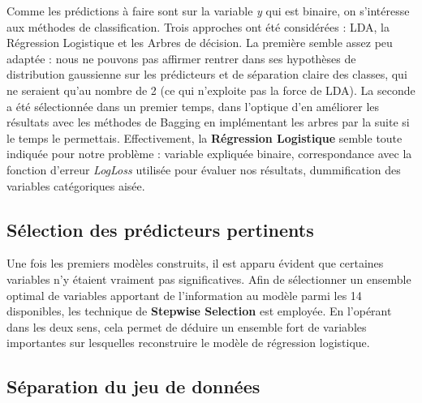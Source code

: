 \documentclass[]{article}
\begin{document}
Comme les prédictions à faire sont sur la variable \textit{y} qui est binaire, on s'intéresse aux méthodes de classification. Trois approches ont été considérées : LDA, la Régression Logistique et les Arbres de décision. La première semble assez peu adaptée : nous ne pouvons pas affirmer rentrer dans ses hypothèses de distribution gaussienne sur les prédicteurs et de séparation claire des classes, qui ne seraient qu'au nombre de 2 (ce qui n'exploite pas la force de LDA). La seconde a été sélectionnée dans un premier temps, dans l'optique d'en améliorer les résultats avec les méthodes de Bagging en implémentant les arbres par la suite si le temps le permettais. Effectivement, la \textbf{Régression Logistique} semble toute indiquée pour notre problème : variable expliquée binaire, correspondance avec la fonction d'erreur \textit{LogLoss} utilisée pour évaluer nos résultats, dummification des variables catégoriques aisée.

\subsection{Sélection des prédicteurs pertinents}

Une fois les premiers modèles construits, il est apparu évident que certaines variables n'y étaient vraiment pas significatives. Afin de sélectionner un ensemble optimal de variables apportant de l'information au modèle parmi les 14 disponibles, les technique de \textbf{Stepwise Selection} est employée. En l'opérant dans les deux sens, cela permet de déduire un ensemble fort de variables importantes sur lesquelles reconstruire le modèle de régression logistique.

\subsection{Séparation du jeu de données}
\end{document}
